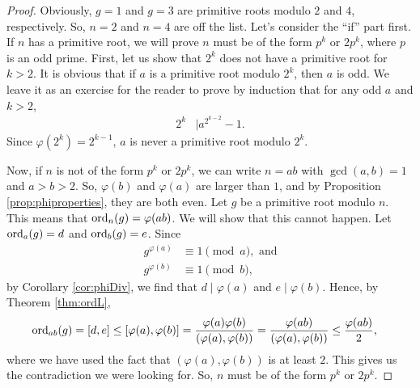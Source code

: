 \documentclass{subfile}
\begin{document}
	\begin{proof}
		Obviously, $g=1$ and $g=3$ are primitive roots modulo $2$ and $4$, respectively. So, $n=2$ and $n=4$ are off the list. Let's consider the ``if'' part first. If $n$ has a primitive root, we will prove $n$ must be of the form $p^k$ or $2p^k$, where $p$ is an odd prime.
		First, let us show that $2^k$ does not have a primitive root for $k >2$. It is obvious that if $a$ is a primitive root modulo $2^k$, then $a$ is odd. We leave it as an exercise for the reader to prove by induction that for any odd $a$ and $k>2$,
			\begin{align*}
				2^k & \mid a^{2^{k-2}}-1.
			\end{align*}
		Since $\varphi(2^k)=2^{k-1}$, $a$ is never a primitive root modulo $2^k$.
		
		Now, if $n$ is not of the form $p^k$ or $2p^k$, we can write $n=ab$ with $\gcd(a,b)=1$ and $a>b>2$. So, $\varphi(b)$ and $\varphi(a)$ are larger than $1$, and by Proposition \ref{prop:phiproperties}, they are both even. Let $g$ be a primitive root modulo $n$. This means that $\operatorname{ord}_{n}(g)=\varphi(ab)$. We will show that this cannot happen. Let $\operatorname{ord}_a(g)=d$ and $\operatorname{ord}_b(g)=e$. Since
			\begin{align*}
				g^{\varphi(a)} & \equiv1\pmod a, \mbox{ and}\\
				g^{\varphi(b)} & \equiv1\pmod b,
			\end{align*}
		by Corollary \eqref{cor:phiDiv}, we find that $d \mid \varphi(a)$ and $e\mid \varphi(b)$.
		Hence, by Theorem \eqref{thm:ordL},
			\begin{eqnarray*}
				\operatorname{ord}_{ab}(g) & =  [d,e] \leq [\varphi(a),\varphi(b)] = \dfrac{\varphi(a) \varphi(b)}{(\varphi(a), \varphi(b))} = \dfrac{\varphi(ab)}{(\varphi(a), \varphi(b))} \leq  \dfrac{\varphi(ab)}{2},
			\end{eqnarray*}
		where we have used the fact that $(\varphi(a),\varphi(b))$ is at least $2$. This gives us the contradiction we were looking for. So, $n$ must be of the form $p^k$ or $2p^k$.
		

\end{proof}
\end{document}
